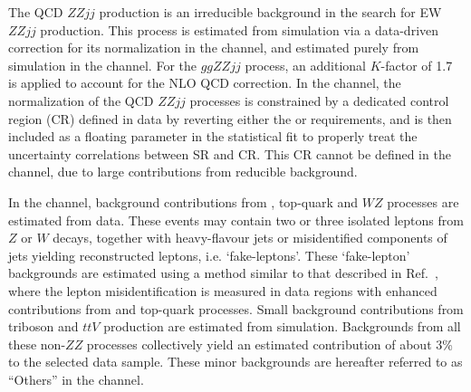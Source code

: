 The QCD $ZZjj$ production is an irreducible background in the search for EW $ZZjj$ production.
This process is estimated from simulation via a data-driven correction for its normalization in the \lllljj channel, and estimated purely from simulation in the \llvvjj channel.
For the $ggZZjj$ process, an additional $K$-factor of 1.7~\cite{PhysRevD.92.094028} is applied to account for the NLO QCD correction.
In the \lllljj channel, the normalization of the QCD $ZZjj$ processes is constrained by a dedicated control region (CR) defined in data by reverting either the \mjj or \dyjj requirements,
and is then included as a floating parameter in the statistical fit to properly treat the uncertainty correlations between SR and CR.
This CR cannot be defined in the \llvvjj channel, due to large contributions from reducible background.

In the \lllljj channel, background contributions from \Zjet, top-quark and $WZ$ processes are estimated from data.
These events may contain two or three isolated leptons from $Z$ or $W$ decays, together with heavy-flavour jets or misidentified components of jets yielding reconstructed leptons, i.e. `fake-leptons'.
These `fake-lepton' backgrounds are estimated using a method similar to that described in Ref.~\cite{Aaboud:2017rwm},
where the lepton misidentification is measured in data regions with enhanced contributions from \Zjet and top-quark processes.
Small background contributions from triboson and $ttV$ production are estimated from simulation.
Backgrounds from all these non-$ZZ$ processes collectively yield an estimated contribution of about 3\% to the selected data sample. These minor backgrounds are hereafter referred to as ``Others'' in the \lllljj channel.

